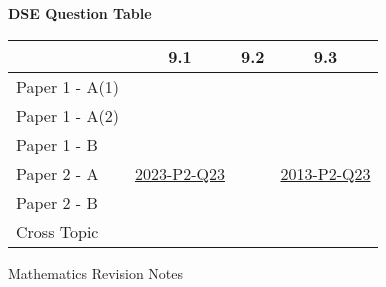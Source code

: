 \documentclass[12pt, a4paper]{article}
\begin{document}
\begin{absolutelynopagebreak}
\begin{center}
\textbf{DSE Question Table}
\end{center}
\begin{center}
\begin{tabular}{|l|c|c|c|}
\hline
        & 9.1 & 9.2 & 9.3 \\\hline
\hline
Paper 1 - A(1)&  &  &  \\
\hline
Paper 1 - A(2)&  &  &  \\
\hline
Paper 1 - B&  &  &  \\
\hline
\hline
Paper 2 - A& \hyperref[DSE2023-CoreP2-Q23]{2023-P2-Q23} &  & \hyperref[DSE2013-CoreP2-Q23]{2013-P2-Q23} \\
\hline
Paper 2 - B&  &  &  \\
\hline
\hline
Cross Topic&  &  &  \\
\hline
\end{tabular}
\end{center}
\end{absolutelynopagebreak}
\newpage
\newpage
\thispagestyle{empty}
\begin{center}
Mathematics Revision Notes\\\vspace{1cm}
\\\vspace{1cm}
{\fontsize{24pt}{24pt}\selectfont {Applications of Trigonometry}} \\\vspace{1cm}
\label{chapter:S3-10}

\end{center}
\vspace{0.5cm}
\hline
\end{document}
